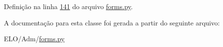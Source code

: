 Definição na linha \hyperlink{Adm_2forms_8py_source_l00141}{141} do arquivo \hyperlink{Adm_2forms_8py_source}{forms.\-py}.



A documentação para esta classe foi gerada a partir do seguinte arquivo\-:\begin{DoxyCompactItemize}
\item 
E\-L\-O/\-Adm/\hyperlink{Adm_2forms_8py}{forms.\-py}\end{DoxyCompactItemize}
